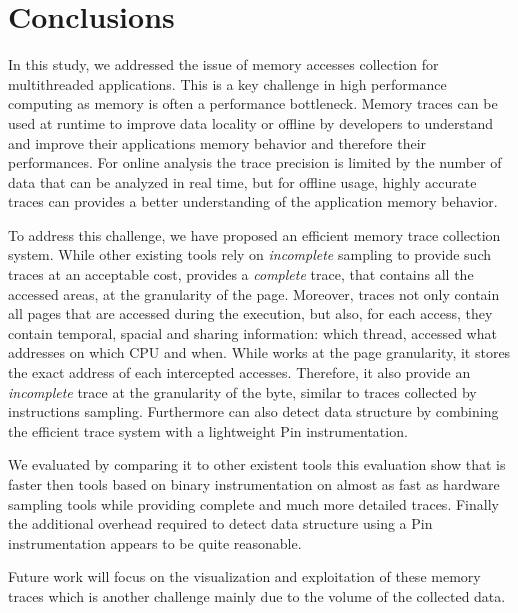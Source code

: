\section{Conclusions}
\label{sec:cncl}

In this study, we addressed the issue of memory accesses collection for
multithreaded applications. This is a key challenge in high performance
computing as memory is often a performance
bottleneck. Memory traces can be used at runtime to improve data locality or
offline by developers to understand and improve their applications memory
behavior and therefore their performances. For online analysis the trace precision
is limited by the number of data that can be analyzed in real time, but for
offline usage, highly accurate traces can provides a better understanding of
the application memory behavior.

To address this challenge, we have proposed \Moca an efficient memory trace
collection system. While other existing tools rely on \emph{incomplete} sampling to
provide such traces at an acceptable cost, \Moca provides a \emph{complete}
trace, that contains all the accessed areas, at the granularity of the page.
Moreover, \Moca traces not only
contain all pages that are accessed during the execution, but also, 
for each access, they contain temporal, spacial and sharing
information: which thread, accessed what addresses on which CPU and when.
While \Moca works at the page granularity, it stores the exact
address of each intercepted accesses. Therefore, it also provide an
\emph{incomplete} trace at the granularity of the byte, similar to
traces collected by instructions sampling. Furthermore \Moca can also detect
data structure by combining the efficient trace system with a lightweight Pin
instrumentation.

We evaluated \Moca by comparing it to other existent tools this evaluation
show that \Moca is faster then tools based on binary instrumentation on
almost as fast as hardware sampling tools while providing complete and much
more detailed traces.
Finally the additional overhead required to detect data structure using a Pin
instrumentation appears to be quite reasonable.

Future work will focus on the visualization and exploitation of these memory traces
which is another challenge mainly due to the volume of the collected data.
